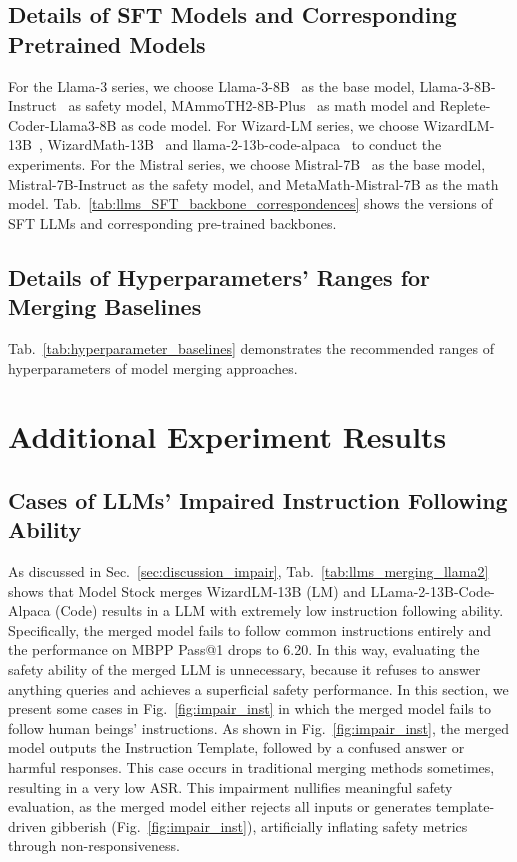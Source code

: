 \subsection{Details of SFT Models and Corresponding Pretrained Models}
\label{sec:sft-models-info}
For the Llama-3 series, we choose Llama-3-8B~\cite{llama3} as the base model, Llama-3-8B-Instruct~\cite{llama3-instruct} as safety model, MAmmoTH2-8B-Plus~\cite{yue2024mammoth2} as math model and Replete-Coder-Llama3-8B as code model. For Wizard-LM series, we choose WizardLM-13B~\cite{xu2024wizardlm}, WizardMath-13B~\cite{luo2023wizardmath} and llama-2-13b-code-alpaca~\cite{touvron2023llama2} to conduct the experiments. For the Mistral series, we choose Mistral-7B~\cite{jiang2023mistral7b} as the base model, Mistral-7B-Instruct as the safety model, and MetaMath-Mistral-7B as the math model. 
Tab.~\ref{tab:llms_SFT_backbone_correspondences} shows the versions of SFT LLMs and corresponding pre-trained backbones.


\subsection{Details of Hyperparameters' Ranges for Merging Baselines}
\label{sec:hyperparam-baselines}

Tab.~\ref{tab:hyperparameter_baselines} demonstrates the recommended ranges of hyperparameters of model merging approaches.




\section{Additional Experiment Results}
\subsection{Cases of LLMs’ Impaired Instruction Following Ability}
\label{sec:appendix_impair_Instruct_following}

As discussed in Sec.~\ref{sec:discussion_impair}, 
Tab.~\ref{tab:llms_merging_llama2} shows that Model Stock merges WizardLM-13B (LM) and LLama-2-13B-Code-Alpaca (Code) results in a LLM with extremely low instruction following ability. Specifically, the merged model fails to follow common instructions entirely and the performance on MBPP Pass@1 drops to 6.20. In this way, evaluating the safety ability of the merged LLM is unnecessary, because it refuses to answer anything queries and achieves a superficial safety performance. 
In this section, we present some cases in Fig.~\ref{fig:impair_inst} in which the merged model fails to follow human beings' instructions. As shown in Fig.~\ref{fig:impair_inst}, the merged model outputs the Instruction Template, followed by a confused answer or harmful responses. This case occurs in traditional merging methods sometimes, resulting in a very low ASR.
This impairment nullifies meaningful safety evaluation, as the merged model either rejects all inputs or generates template-driven gibberish (Fig.~\ref{fig:impair_inst}), artificially inflating safety metrics through non-responsiveness.

